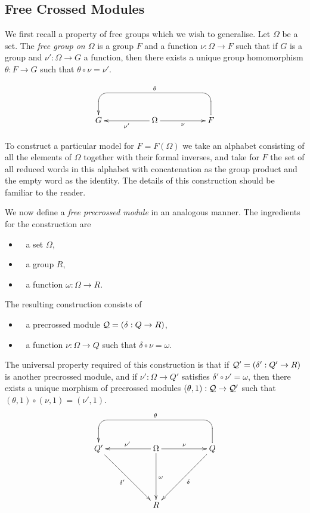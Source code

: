 \subsection{Free Crossed Modules} \label{subs:free-xmod}

We first recall a property of free groups which we wish to generalise.
Let  $\Omega$  be a set.
The \emph{free group on $\Omega$} is a group $F$ and a function
$\nu : \Omega \to F$  such that if $G$ is a group and  
$\nu' : \Omega \to G$ a function, then there exists a unique
group homomorphism  $\theta : F \to G$  such that  
$\theta\circ\nu = \nu'$.

$$\xy
\xymatrix{
   &&&&&&  \\
   &      G  
    &&    \Omega  \ar[rr]_{\nu} 
             \ar[ll]^{\nu'}   
      &&  F  \ar `u[-1,-1] `[0,-4]_{\theta} [0,-4]
        &    \\
}
\endxy$$

\bigskip
To construct a particular model for $F = F(\Omega)$ we take an alphabet
consisting of all the elements of $\Omega$ together with their
formal inverses, and take for $F$ the set of all reduced words
in this alphabet with concatenation as the group product
and the empty word as the identity.  The details of this construction
should be familiar to the reader.

We now define a \emph{free precrossed module} in an analogous manner.
The ingredients for the construction are
\begin{itemize}
\item~ a set $\Omega$,
\item~ a group $R$,
\item~ a function $\omega : \Omega \to R$.
\end{itemize}
The resulting construction consists of
\begin{itemize}
\item~ a precrossed module $\mathcal{Q} = (\delta : Q \to R)$,
\item~ a function  $\nu : \Omega \to Q$  such that  
$\delta\circ\nu = \omega$.
\end{itemize}
The universal property required of this construction 
is that if  $\mathcal{Q}' = (\delta' : Q' \to R)$
is another precrossed module, and if  $\nu' : \Omega \to Q'$
satisfies  $\delta'\circ\nu' = \omega$,
then there exists a unique morphism of precrossed modules
$(\theta,1) : \mathcal{Q} \to \mathcal{Q}'$  such that  
$(\theta,1)\circ(\nu,1) = (\nu',1)$.
$$
\xy
\xymatrix{
   &&&&&&  \\
   &      Q' \ar[ddrr]_{\delta'}
    &&    \Omega  \ar[rr]^{\nu} 
             \ar[ll]_{\nu'}  
             \ar[dd]^{\omega} 
      &&  Q  \ar[ddll] ^{\delta}  
           \ar `u[-1,-1] `[0,-4]_{\theta} [0,-4]
        &    \\
   &&&&&& \\
   &&&    R
      &&& \\ 
}
\endxy$$

